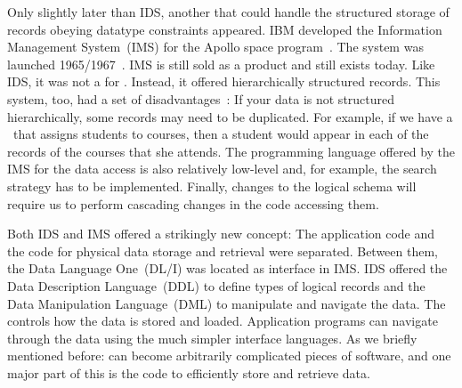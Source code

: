 Only slightly later than IDS, another  that could handle the structured storage of records obeying datatype constraints appeared.
IBM developed the Information Management System~(IMS) for the Apollo space program~\cite{KLBGNLWBS2012ITIYCGTIIMS}.
The system was launched 1965/1967~\cite{BBP2007TBOI}.
IMS is still sold as a product and still exists today.
Like IDS, it was not a  for \emph{}.
Instead, it offered hierarchically structured records.
This system, too, had a set of disadvantages~\cite{KC2024DS:ITD}:
If your data is not structured hierarchically, some records may need to be duplicated.
For example, if we have a \db\ that assigns students to courses, then a student would appear in each of the records of the courses that she attends.
The programming language offered by the IMS for the data access is also relatively low-level and, for example, the search strategy has to be implemented.
Finally, changes to the logical schema will require us to perform cascading changes in the code accessing them.

Both IDS and IMS offered a strikingly new concept:
The application code and the code for physical data storage and retrieval were separated.
Between them, the Data Language One~(DL/I) was located as interface in IMS.
IDS offered the Data Description Language~(DDL) to define types of logical records and the Data Manipulation Language~(DML) to manipulate and navigate the data.
The  controls how the data is stored and loaded.
Application programs can navigate through the data using the much simpler interface languages.
As we briefly mentioned before:  can become arbitrarily complicated pieces of software, and one major part of this is the code to efficiently store and retrieve data.

